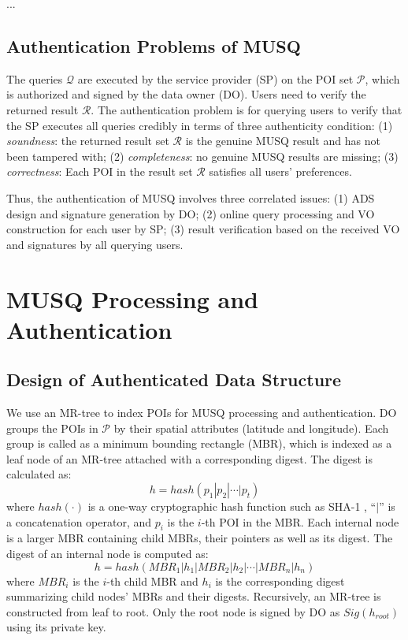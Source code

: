 \documentclass[10pt, conference, compsocconf]{IEEEtran}
\begin{document}
...

\subsection{Authentication Problems of MUSQ}

The queries $\mathcal{Q}$ are executed by the service provider (SP) on the POI set $\mathcal{P}$, which is authorized and signed by the data owner (DO). Users need to verify the returned result $\mathcal{R}$. The authentication problem is for querying users to verify that the SP executes all queries credibly in terms of three authenticity condition: (1) \emph{soundness}: the returned result set $\mathcal{R}$ is the genuine MUSQ result and has not been tampered with; (2) \emph{completeness}: no genuine MUSQ results are missing; (3) \emph{correctness}: Each POI in the result set $\mathcal{R}$ satisfies all users' preferences.

Thus, the authentication of MUSQ involves three correlated issues: (1) ADS design and signature generation by DO; (2) online query processing and VO construction for each user by SP; (3) result verification based on the received VO and signatures by all querying users.


\section{MUSQ Processing and Authentication}\label{MUSQProcessingAndAuthentiaction}

\subsection{Design of Authenticated Data Structure}

We use an MR-tree to index POIs for MUSQ processing and authentication. DO groups the POIs in  $\mathcal{P}$ by their spatial attributes (latitude and longitude). Each group is called as a minimum bounding rectangle (MBR), which is indexed as a leaf node of an MR-tree attached with a corresponding digest. The digest is calculated as:
\begin{equation*}
    h = hash(p_1 | p_2 | \cdots | p_t)
\end{equation*}
where $hash(\cdot)$ is a one-way cryptographic hash function such as SHA-1 \cite{SHA1}, ``$|$'' is a concatenation operator, and $p_i$ is the $i$-th POI in the MBR. Each internal node is a larger MBR containing child MBRs, their pointers as well as its digest. The digest of an internal node is computed as:
\begin{equation*}
    h = hash(MBR_1 | h_1 | MBR_2 | h_2 | \cdots | MBR_n | h_n)
\end{equation*}
where $MBR_i$ is the $i$-th child MBR and $h_i$ is the corresponding digest summarizing child nodes' MBRs and their digests. Recursively, an MR-tree is constructed from leaf to root. Only the root node is signed by DO as $Sig(h_{root})$ using its private key.
\end{document}
